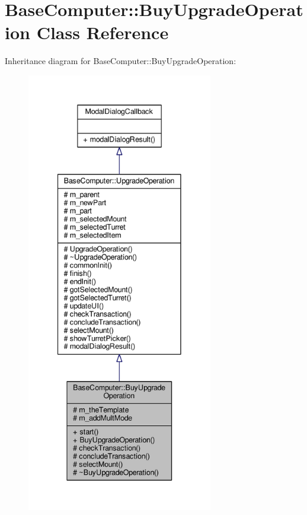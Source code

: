 \hypertarget{classBaseComputer_1_1BuyUpgradeOperation}{}\section{Base\+Computer\+:\+:Buy\+Upgrade\+Operation Class Reference}
\label{classBaseComputer_1_1BuyUpgradeOperation}


Inheritance diagram for Base\+Computer\+:\+:Buy\+Upgrade\+Operation\+:
\nopagebreak
\begin{figure}[H]
\begin{center}
\leavevmode
\includegraphics[height=550pt]{da/d26/classBaseComputer_1_1BuyUpgradeOperation__inherit__graph}
\end{center}
\end{figure}


